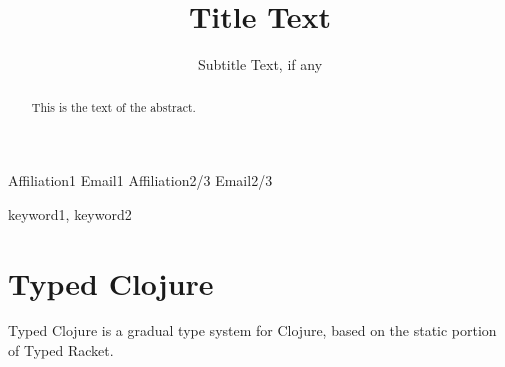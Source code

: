 \documentclass{sigplanconf}
\begin{document}
\setlength{\pdfpageheight}{\paperheight}
\setlength{\pdfpagewidth}{\paperwidth}






\title{Title Text}
\subtitle{Subtitle Text, if any}

           {Affiliation1}
           {Email1}
           {Affiliation2/3}
           {Email2/3}

\maketitle

\begin{abstract}
This is the text of the abstract.
\end{abstract}



\keywords
keyword1, keyword2

\section{Typed Clojure}

Typed Clojure is a gradual type system for Clojure, based on the
static portion of Typed Racket.

\end{document}

